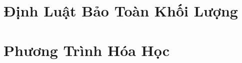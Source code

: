 \documentclass{article}
\numberwithin{equation}{section}
\begin{document}

\section{Định Luật Bảo Toàn Khối Lượng}


\section{Phương Trình Hóa Học}


\printbibliography[heading=bibintoc]
	
\end{document}
